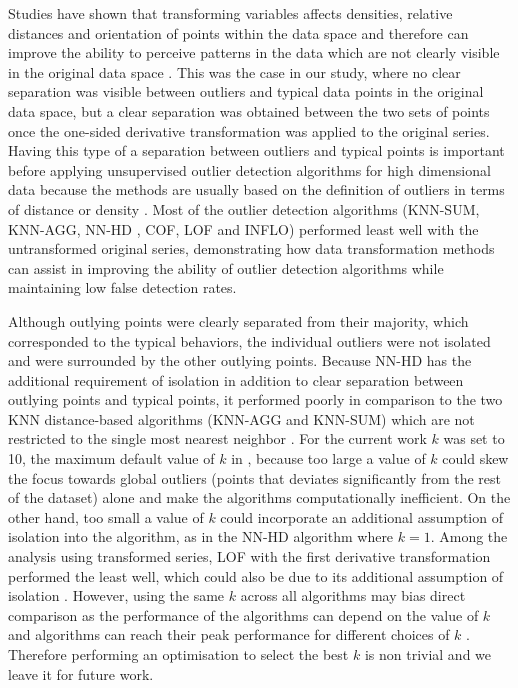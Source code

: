 \documentclass[draft]{agujournal2018} %
\begin{document}
Studies have shown that transforming variables affects densities,
relative distances and orientation of points within the data space and
therefore can improve the ability to perceive patterns in the data which
are not clearly visible in the original data space
\citep{dang2014transforming}. This was the case in our study, where
no clear separation was visible between outliers and typical data points
in the original data space, but a clear separation was obtained between
the two sets of points once the one-sided derivative transformation was
applied to the original series. Having this type of a separation between
outliers and typical points is important before applying unsupervised
outlier detection algorithms for high dimensional data because the methods
are usually based on the definition of outliers in terms of distance or
density \citep{talagala2018anomaly}. Most of the outlier detection
algorithms (KNN-SUM, KNN-AGG, \color{black} NN-HD \color{black}, COF, LOF and INFLO) performed
least well with the untransformed original series, demonstrating how
data transformation methods can assist in improving the ability of
outlier detection algorithms while maintaining low false detection
rates.

Although outlying points were clearly separated from their majority,
which corresponded to the typical behaviors, the individual outliers
were not isolated and were surrounded by the other outlying points.
Because \color{black} NN-HD \color{black} has the additional requirement of isolation in
addition to clear separation between outlying points and typical points,
it performed poorly in comparison to the two KNN distance-based
algorithms (KNN-AGG and KNN-SUM) which are not restricted to the single
most nearest neighbor \citep{talagala2018anomaly}. For the current
work \(k\) was set to 10, the maximum default value of \(k\) in
\citet{madsen2018ddoutlier}, because too large a value of \(k\) could
skew the focus towards global outliers (points that deviates significantly from the rest of the dataset) alone \citep{zhang2009new} and
make the algorithms computationally inefficient. On the other hand, too
small a value of \(k\) could incorporate an additional assumption of
isolation into the algorithm, as in the \color{black} NN-HD algorithm \color{black} where \(k=1\).
Among the analysis using transformed series, LOF with the first
derivative transformation performed the least well, which could also be due
to its additional assumption of isolation \citep{tang2002enhancing}. \color{black} However, using the same \(k\)  across all algorithms may bias direct comparison as the performance of the algorithms can depend on the value of  \(k\) and algorithms can reach their peak performance for different choices of  \(k\)  \citep{campos2016evaluation}. Therefore performing an optimisation to select the best \(k\)  is non trivial and we leave it for future work. \color{black}
\end{document}
